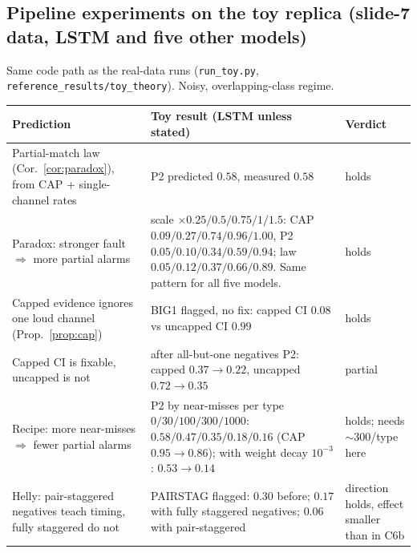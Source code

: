 \documentclass[11pt]{article}
\theoremstyle{definition}
\theoremstyle{remark}
\newcommand{\1}{\mathbf{1}}
\begin{document}
\subsection*{Pipeline experiments on the toy replica (slide-7 data, LSTM and five other models)}
Same code path as the real-data runs (\texttt{run\_toy.py}, \texttt{reference\_results/toy\_theory}). Noisy, overlapping-class regime.
\begin{center}\small
\begin{tabular}{p{4.2cm}p{7.6cm}p{2.6cm}}
\toprule
Prediction & Toy result (LSTM unless stated) & Verdict \\
\midrule
Partial-match law (Cor.~\ref{cor:paradox}), from CAP + single-channel rates & P2 predicted $0.58$, measured $0.58$ & holds \\
Paradox: stronger fault $\Rightarrow$ more partial alarms & scale $\times0.25/0.5/0.75/1/1.5$: CAP $0.09/0.27/0.74/0.96/1.00$, P2 $0.05/0.10/0.34/0.59/0.94$; law $0.05/0.12/0.37/0.66/0.89$. Same pattern for all five models. & holds \\
Capped evidence ignores one loud channel (Prop.~\ref{prop:cap}) & BIG1 flagged, no fix: capped CI $0.08$ vs uncapped CI $0.99$ & holds \\
Capped CI is fixable, uncapped is not & after all-but-one negatives P2: capped $0.37\to0.22$, uncapped $0.72\to0.35$ & partial \\
Recipe: more near-misses $\Rightarrow$ fewer partial alarms & P2 by near-misses per type $0/30/100/300/1000$: $0.58/0.47/0.35/0.18/0.16$ (CAP $0.95\to0.86$); with weight decay $10^{-3}$: $0.53\to0.14$ & holds; needs $\sim$300/type here \\
Helly: pair-staggered negatives teach timing, fully staggered do not & PAIRSTAG flagged: $0.30$ before; $0.17$ with fully staggered negatives; $0.06$ with pair-staggered & direction holds, effect smaller than in C6b \\
\bottomrule
\end{tabular}
\end{center}

\end{document}
